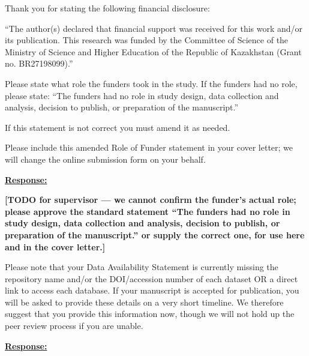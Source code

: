 \documentclass{article}
\begin{document}
\vspace{0.3cm}


\begin{cmt}{}{}

Thank you for stating the following financial disclosure:

``The author(s) declared that financial support was received for this work
and/or its publication. This research was funded by the Committee of Science of
the Ministry of Science and Higher Education of the Republic of Kazakhstan
(Grant no. BR27198099).''

Please state what role the funders took in the study. If the funders had no
role, please state: ``The funders had no role in study design, data collection
and analysis, decision to publish, or preparation of the manuscript.''

If this statement is not correct you must amend it as needed.

Please include this amended Role of Funder statement in your cover letter; we
will change the online submission form on your behalf.

\end{cmt}
\vspace{0.1cm}
\noindent
\underline{\textbf{Response:}}
\vspace{0.2cm}

\textbf{[TODO for supervisor --- we cannot confirm the funder's actual role;
please approve the standard statement ``The funders had no role in study
design, data collection and analysis, decision to publish, or preparation of
the manuscript.'' or supply the correct one, for use here and in the cover
letter.]}

\vspace{0.3cm}


\begin{cmt}{}{}

Please note that your Data Availability Statement is currently missing the
repository name and/or the DOI/accession number of each dataset OR a direct link
to access each database. If your manuscript is accepted for publication, you
will be asked to provide these details on a very short timeline. We therefore
suggest that you provide this information now, though we will not hold up the
peer review process if you are unable.

\end{cmt}
\vspace{0.1cm}
\noindent
\underline{\textbf{Response:}}
\vspace{0.2cm}
\end{document}
